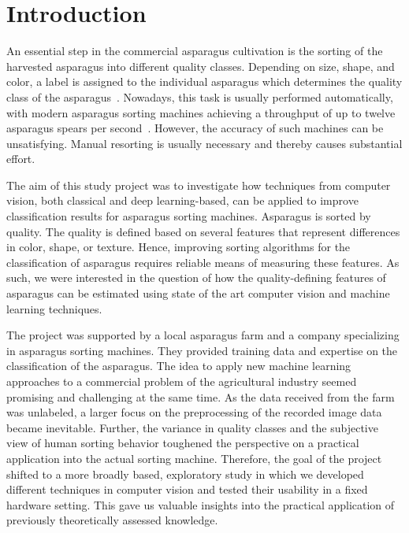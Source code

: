 \section{Introduction}
\label{ch:Introduction}

An essential step in the commercial asparagus cultivation is the sorting of the harvested asparagus into different quality classes. Depending on size, shape, and color, a label is assigned to the individual asparagus which determines the quality class of the asparagus~\citep{unspargelnorm}. Nowadays, this task is usually performed automatically, with modern asparagus sorting machines achieving a throughput of up to twelve asparagus spears per second~\citep{ting2015zeitalter}. However, the accuracy of such machines can be unsatisfying. Manual resorting is usually necessary and thereby causes substantial effort.

\bigskip
The aim of this study project was to investigate how techniques from computer vision, both classical and deep learning-based, can be applied to improve classification results for asparagus sorting machines. Asparagus is sorted by quality. The quality is defined based on several features that represent differences in color, shape, or texture. Hence, improving sorting algorithms for the classification of asparagus requires reliable means of measuring these features. As such, we were interested in the question of how the quality-defining features of asparagus can be estimated using state of the art computer vision and machine learning techniques.

The project was supported by a local asparagus farm and a company specializing in asparagus sorting machines. They provided training data and expertise on the classification of the asparagus. The idea to apply new machine learning approaches to a commercial problem of the agricultural industry seemed promising and challenging at the same time. As the data received from the farm was unlabeled, a larger focus on the preprocessing of the recorded image data became inevitable. Further, the variance in quality classes and the subjective view of human sorting behavior toughened the perspective on a practical application into the actual sorting machine. Therefore, the goal of the project shifted to a more broadly based, exploratory study in which we developed different techniques in computer vision and tested their usability in a fixed hardware setting. This gave us valuable insights into the practical application of previously theoretically assessed knowledge.

